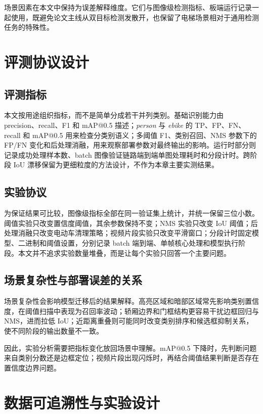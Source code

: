 场景因素在本文中保持为误差解释维度。它们与图像级检测指标、板端运行记录一起使用，既避免论文主线从双目标检测发散开，也保留了电梯场景相对于通用检测任务的特殊性。

\section{评测协议设计}

\subsection{评测指标}

本文按用途组织指标，而不是简单分成若干并列类别。基础识别能力由 precision、recall、F1 和 mAP@0.5 描述；\textit{person} 与 \textit{ebike} 的 TP、FP、FN、recall 和 mAP@0.5 用来检查分类别语义；多阈值 F1、类别召回、NMS 参数下的 FP/FN 变化和后处理消融，用来观察部署参数对最终输出的影响。运行时部分则记录成功处理样本数、batch 图像验证链路端到端单图处理耗时和分段计时。跨阶段 IoU 漂移保留为更细粒度的方法设计，不作为本章主要实测结果。

\subsection{实验协议}

为保证结果可比较，图像级指标全部在同一验证集上统计，并统一保留三位小数。阈值实验只改变置信度阈值，其余参数保持不变；NMS 实验只改变 IoU 阈值；后处理消融只改变电动车清理策略；视频片段实验只改变平滑窗口；分段计时固定模型、二进制和阈值设置，分别记录 batch 端到端、单帧核心处理和模型执行阶段。本文并不追求实验数量堆叠，而是让每个实验只回答一个主要问题。

\subsection{场景复杂性与部署误差的关系}

场景复杂性会影响模型迁移后的结果解释。高亮区域和暗部区域常先影响类别置信度，在阈值扫描中表现为召回率波动；轿厢边界和门框结构更容易干扰边框回归与 NMS，进而拉低 IoU；近距离重叠则可能同时改变类别排序和候选框抑制关系，使不同阶段的输出数量不一致。

因此，实验分析需要把指标变化放回场景中理解。mAP@0.5 下降时，先判断问题来自类别分数还是边框定位；视频片段出现闪烁时，再结合阈值结果判断是否存在置信度边界问题。


\section{数据可追溯性与实验设计}

